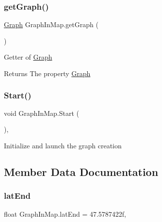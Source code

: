 \subsubsection{\texorpdfstring{get\+Graph()}{getGraph()}}
{\footnotesize\ttfamily \hyperlink{classGraph}{Graph} Graph\+In\+Map.\+get\+Graph (\begin{DoxyParamCaption}{ }\end{DoxyParamCaption})\hspace{0.3cm}{\ttfamily [inline]}}



Getter of {\ttfamily \hyperlink{classGraph}{Graph}} 

\begin{DoxyReturn}{Returns}
The property {\ttfamily \hyperlink{classGraph}{Graph}}
\end{DoxyReturn}
\mbox{\label{classGraphInMap_a093ceede1053f87087bd3e4696fcae09}} 
\subsubsection{\texorpdfstring{Start()}{Start()}}
{\footnotesize\ttfamily void Graph\+In\+Map.\+Start (\begin{DoxyParamCaption}{ }\end{DoxyParamCaption})\hspace{0.3cm}{\ttfamily [inline]}, {\ttfamily [private]}}



Initialize and launch the graph creation 



\subsection{Member Data Documentation}
\mbox{\label{classGraphInMap_a069890e3bb1f0ca907507a6651704b32}} 
\subsubsection{\texorpdfstring{lat\+End}{latEnd}}
{\footnotesize\ttfamily float Graph\+In\+Map.\+lat\+End = 47.\+5787422f\hspace{0.3cm}{\ttfamily [static]}, {\ttfamily [private]}}



